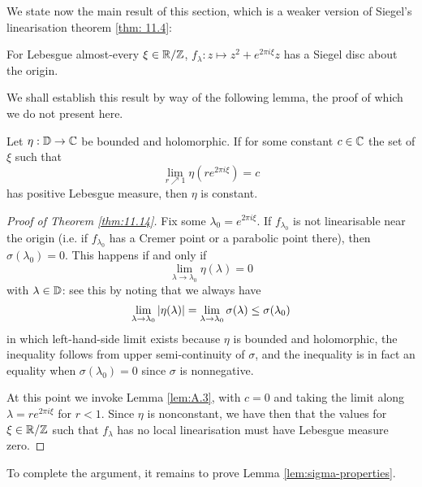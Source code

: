\documentclass[../main.tex]{subfiles}
\begin{document}
We state now the main result of this section, which is a weaker version of Siegel's linearisation theorem \ref{thm: 11.4}:

\begin{thm}\label{thm:11.14}
For Lebesgue almost-every $\xi \in \mathbb{R}/\mathbb{Z}$, $f_\lambda : z \mapsto z^2 + e^{2 \pi i \xi} z$ has a Siegel disc about the origin.
\end{thm}

We shall establish this result by way of the following lemma, the proof of which we do not present here.

\begin{lem}\label{lem:A.3}
    Let $\eta: \mathbb{D} \to \mathbb{C}$ be bounded and holomorphic. If for some constant $c \in \mathbb{C}$ the set of $\xi$ such that
    \[
    \lim_{r\nearrow 1} \eta (r e^{2\pi i \xi}) = c
    \]
    has positive Lebesgue measure, then $\eta$ is constant.
\end{lem}



\begin{proof}[Proof of Theorem \ref{thm:11.14}]

Fix some $\lambda_0 = e^{2\pi i \xi}$. If $f_{\lambda_0}$ is not linearisable near the origin (i.e. if $f_{\lambda_0}$ has a Cremer point or a parabolic point there), then $\sigma(\lambda_0) = 0$. This happens if and only if
\[
\lim_{\lambda \to \lambda_0} \eta(\lambda) = 0 
\]
with $\lambda \in \mathbb{D}$: see this by noting that we always have
\[
\lim_{\lambda \to\lambda_0} \left|\eta(\lambda)\right| =
\lim_{\lambda \to\lambda_0} \sigma(\lambda) \le \sigma(\lambda_0)
\]
in which left-hand-side limit exists because $\eta$ is bounded and holomorphic, the inequality follows from upper semi-continuity of $\sigma$, and the inequality is in fact an equality when $\sigma(\lambda_0) = 0$ since $\sigma$ is nonnegative.

At this point we invoke Lemma \ref{lem:A.3}, with $c = 0$ and taking the limit along $\lambda = re^{2\pi i\xi}$ for $r < 1$. Since $\eta$ is nonconstant, we have then that the values for $\xi \in \mathbb{R}/\mathbb{Z}$ such that $f_\lambda$ has no local linearisation must have Lebesgue measure zero.
\end{proof}

To complete the argument, it remains to prove Lemma \ref{lem:sigma-properties}.
\end{document}
